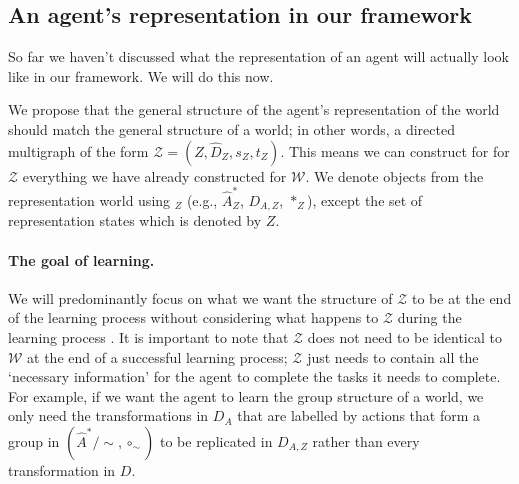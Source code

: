 \subsection{An agent's representation in our framework}

So far we haven't discussed what the representation of an agent will actually look like in our framework.
We will do this now.

We propose that the general structure of the agent's representation of the world should match the general structure of a world; in other words, a directed multigraph of the form $\mathscr{Z} = (Z, \hat{D}_{Z}, s_{Z}, t_{Z})$.
This means we can construct for for $\mathscr{Z}$ everything we have already constructed for $\mathscr{W}$.
We denote objects from the representation world using $_{Z}$ (e.g., $\hat{A}^{*}_{Z}$, $D_{A, Z}$, $\ast_{Z}$), except the set of representation states which is denoted by $Z$.

\paragraph{The goal of learning.}
We will predominantly focus on what we want the structure of $\mathscr{Z}$ to be at the end of the learning process without considering what happens to $\mathscr{Z}$ during the learning process .
It is important to note that $\mathscr{Z}$ does not need to be identical to $\mathscr{W}$ at the end of a successful learning process; $\mathscr{Z}$ just needs to contain all the `necessary information' for the agent to complete the tasks it needs to complete.
For example, if we want the agent to learn the group structure of a world, we only need the transformations in $D_{A}$ that are labelled by actions that form a group in $(\hat{A}^{*}/\sim, \circ_{\sim})$ to be replicated in $D_{A, Z}$ rather than every transformation in $D$.



